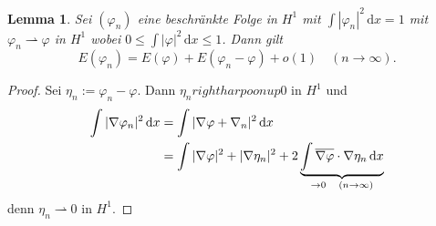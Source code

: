 \documentclass[
paper=a4,
bibtotocnumbered,
liststotocnumbered,
tablecaptionabove,
pointlessnumbers,
twoside,
openright,
10pt
]
{report}
\let\Re\relax\let\Im\relax
\DeclareMathOperator{\Re}{Re}
\DeclareMathOperator{\Im}{Im}
\let\phi\varphi
\newtheorem{lem}[thm]{Lemma}
\theoremstyle{definition}
\numberwithin{equation}{chapter}
\begin{document}
\begin{lem}\label{5.12}
Sei $(\phi_n)$ eine beschränkte Folge in $H^1$ mit $\int |\phi_n|^2\, \mathrm dx =1$ mit $\phi_n \rightharpoonup \phi$ in $H^1$ wobei $0 \le \int |\phi|^2\, \mathrm dx \le 1$. Dann gilt 
\begin{equation}
E(\phi_n) = E(\phi) + E(\phi_n - \phi) + o(1) \quad (n\to \infty).
\end{equation}
\end{lem}
\begin{proof}
Sei $\eta_n := \phi_n - \phi$. Dann $\eta_n rightharpoonup 0$ in $H^1$ und
\begin{align*}
\int |\nabla \phi_n|^2\, \mathrm dx &= \int |\nabla \phi + \nabla_n|^2\, \mathrm dx \\
&=\int |\nabla \phi|^2 + |\nabla \eta_n|^2+ 2\Re \underbrace{\int \overline{\nabla \phi} \cdot \nabla \eta_n \, \mathrm dx}_{\to 0 \quad (n\to \infty)}
\end{align*}
denn $\eta_n \rightharpoonup 0$ in $H^1$.


\end{proof}
\end{document}
